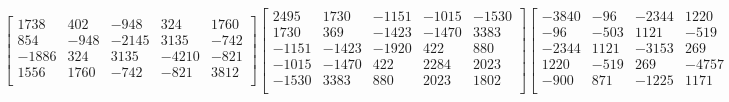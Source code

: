 \documentclass[12pt]{amsart}
\theoremstyle{plain}
\theoremstyle{definition}
\begin{document}
\begin{landscape}
\begin{align*}
\begin{bmatrix}
 1738  &   402  &   -948  &   324  &   1760  \\ 
 854  &   -948  &   -2145  &   3135  &   -742  \\ 
 -1886  &   324  &   3135  &   -4210  &   -821  \\ 
 1556  &   1760  &   -742  &   -821  &   3812  \\ 
\end{bmatrix}
\begin{bmatrix}
2495  &   1730  &   -1151  &   -1015  &   -1530  \\ 
 1730  &   369  &   -1423  &   -1470  &   3383  \\ 
 -1151  &   -1423  &   -1920  &   422  &   880  \\ 
 -1015  &   -1470  &   422  &   2284  &   2023  \\ 
 -1530  &   3383  &   880  &   2023  &   1802  \\ 
\end{bmatrix}
\begin{bmatrix}
-3840  &   -96  &   -2344  &   1220  &   -900  \\ 
 -96  &   -503  &   1121  &   -519  &   871  \\ 
 -2344  &   1121  &   -3153  &   269  &   -1225  \\ 
 1220  &   -519  &   269  &   -4757  &   1171  \\ 
 -900  &   871  &   -1225  &   1171  &   3984  \\ 
\end{bmatrix}
\begin{bmatrix}
-4000  &   -1740  &   -156  &   744  &   -1348  \\ 
 -1740  &   -1494  &   270  &   1296  &   -1110  \\ 
 -156  &   270  &   -161  &   -414  &   202  \\ 
 744  &   1296  &   -414  &   -1556  &   208  \\ 
 -1348  &   -1110  &   202  &   208  &   -4814  \\ 
\end{bmatrix}
\\
\end{align*} 
\end{landscape}
\end{document}
